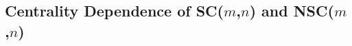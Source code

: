 
\subsection{Centrality Dependence of SC($m$,$n$) and NSC($m$,$n$)}
\label{sec:theory_allorder}
 

% 
 

